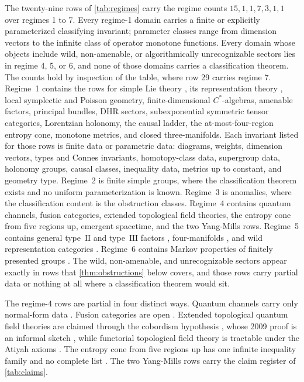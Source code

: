 \documentclass[11pt,letterpaper]{article}
\theoremstyle{definition}
\begin{document}
The twenty-nine rows of \cref{tab:regimes} carry the regime counts $15, 1, 1, 7, 3, 1, 1$ over regimes 1 to 7. Every regime-1 domain carries a finite or explicitly parameterized classifying invariant; parameter classes range from dimension vectors to the infinite class of operator monotone functions. Every domain whose objects include wild, non-amenable, or algorithmically unrecognizable sectors lies in regime 4, 5, or 6, and none of those domains carries a classification theorem. The counts hold by inspection of the table, where row 29 carries regime 7. Regime~1 contains the rows for simple Lie theory \cite{corpus-4}, its representation theory \cite{corpus-5}, local symplectic and Poisson geometry, finite-dimensional $C^*$-algebras, amenable factors, principal bundles, DHR sectors, subexponential symmetric tensor categories, Lorentzian holonomy, the causal ladder, the at-most-four-region entropy cone, monotone metrics, and closed three-manifolds. Each invariant listed for those rows is finite data or parametric data: diagrams, weights, dimension vectors, types and Connes invariants, homotopy-class data, supergroup data, holonomy groups, causal classes, inequality data, metrics up to constant, and geometry type. Regime~2 is finite simple groups, where the classification theorem exists and no uniform parameterization is known. Regime~3 is anomalies, where the classification content is the obstruction classes. Regime~4 contains quantum channels, fusion categories, extended topological field theories, the entropy cone from five regions up, emergent spacetime, and the two Yang-Mills rows. Regime~5 contains general type~$\mathrm{II}$ and type~$\mathrm{III}$ factors \cite{corpus-8}, four-manifolds \cite{corpus-54}, and wild representation categories \cite{corpus-55,corpus-56,corpus-58}. Regime~6 contains Markov properties of finitely presented groups \cite{corpus-53}. The wild, non-amenable, and unrecognizable sectors appear exactly in rows that \cref{thm:obstructions} below covers, and those rows carry partial data or nothing at all where a classification theorem would sit.

The regime-4 rows are partial in four distinct ways. Quantum channels carry only normal-form data \cite{corpus-10,corpus-11}. Fusion categories are open \cite{corpus-14}. Extended topological quantum field theories are claimed through the cobordism hypothesis \cite{corpus-34}, whose 2009 proof is an informal sketch \cite{corpus-35}, while functorial topological field theory is tractable under the Atiyah axioms \cite{corpus-36}. The entropy cone from five regions up has one infinite inequality family and no complete list \cite{corpus-47}. The two Yang-Mills rows carry the claim register of \cref{tab:claims}.
\end{document}
